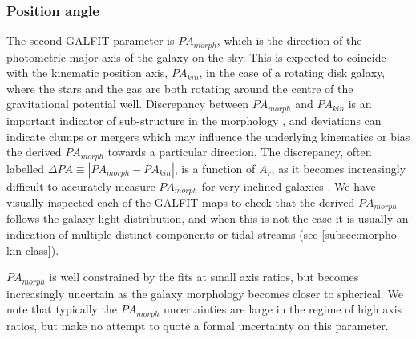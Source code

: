 \documentclass[fleqn,usenatbib]{mn2e}
\begin{document}
\subsubsection{Position angle}\label{subsubsection:position_angle}
The second GALFIT parameter is $PA_{morph}$, which is the direction of the photometric major axis of the galaxy on the sky.
This is expected to coincide with the kinematic position axis, $PA_{kin}$, in the case of a rotating disk galaxy, where the stars and the gas are both rotating around the centre of the gravitational potential well.
Discrepancy between $PA_{morph}$ and $PA_{kin}$ is an important indicator of sub-structure in the morphology \citep[e.g.][]{Queyrel2012,Wisnioski2015,Rodrigues2016}, and deviations can indicate clumps or mergers which may influence the underlying kinematics or bias the derived $PA_{morph}$ towards a particular direction. 
The discrepancy, often labelled $\Delta PA \equiv |PA_{morph} - PA_{kin}|$, is a function of $A_{r}$, as it becomes increasingly difficult to accurately measure $PA_{morph}$ for very inclined galaxies \citep[e.g.][]{Wisnioski2015,Harrison2017}.
We have visually inspected each of the GALFIT maps to check that the derived $PA_{morph}$ follows the galaxy light distribution, and when this is not the case it is usually an indication of multiple distinct components or tidal streams (see \cref{subsec:morpho-kin-class}).

$PA_{morph}$ is well constrained by the fits at small axis ratios, but becomes increasingly uncertain as the galaxy morphology becomes closer to spherical.
We note that typically the $PA_{morph}$ uncertainties are large in the regime of high axis ratios, but make no attempt to quote a formal uncertainty on this parameter.
\end{document}
